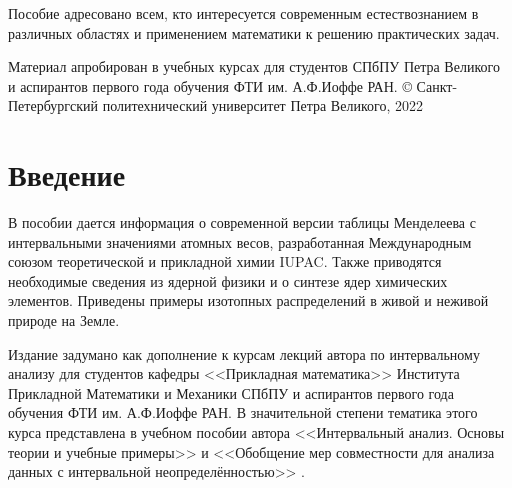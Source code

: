 \documentclass[a5paper,openany]{book}
\begin{document}
Пособие адресовано всем, кто интересуется современным естествознанием в различных областях и применением математики к решению практических задач.


Материал апробирован в учебных курсах для студентов 
СПбПУ Петра Великого и аспирантов первого года обучения ФТИ им. А.Ф.Иоффе РАН.
\hfill \break
\hfill \break
\hfill \break
\copyright 
Санкт-Петербургский политехнический университет Петра Великого, 2022




\tableofcontents      %

\listoffigures
\listoftables

\chapter*{Введение}

\bigskip

В пособии дается информация о современной версии таблицы Менделеева с интервальными значениями атомных весов, разработанная Международным союзом теоретической 
и прикладной химии IUPAC. Также приводятся необходимые сведения из ядерной физики и о синтезе ядер химических элементов. Приведены примеры изотопных распределений в живой и неживой природе на Земле.

Издание задумано как дополнение к курсам лекций автора по интервальному анализу для студентов кафедры <<Прикладная математика>> Института Прикладной Математики и Механики СПбПУ и аспирантов первого года обучения ФТИ им. А.Ф.Иоффе РАН. В значительной степени тематика этого курса представлена в учебном пособии автора <<Интервальный анализ. Основы теории и учебные примеры>> \cite{Bazhenov2020} и <<Обобщение мер совместности для анализа данных с интервальной неопределённостью>> \cite{Bazhenov2022}.
\end{document}
